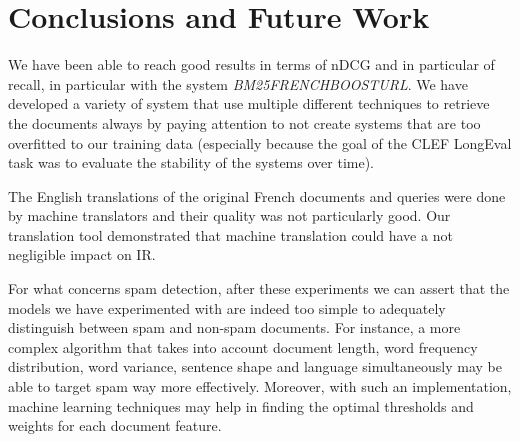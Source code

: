 \section{Conclusions and Future Work}
\label{sec:conclusion}
%
%

We have been able to reach good results in terms of nDCG and in particular of recall, in particular with the system \textit{BM25FRENCHBOOSTURL}. We have developed a variety of system that use multiple different techniques to retrieve the documents always by paying attention to not create systems that are too overfitted to our training data (especially because the goal of the CLEF LongEval task was to evaluate the stability of the systems over time).
\par
The English translations of the original French documents and queries were done by machine translators and their quality was not particularly good. Our translation tool demonstrated that machine translation could have a not negligible impact on IR.
\par
For what concerns spam detection, after these experiments we can assert that the models we have experimented with are indeed too simple to adequately distinguish between spam and non-spam documents.
For instance, a more complex algorithm that takes into account document length, word frequency distribution, word variance, sentence shape and language simultaneously may be able to target spam way more effectively. Moreover, with such an implementation, machine learning techniques may help in finding the optimal thresholds and weights for each document feature.

